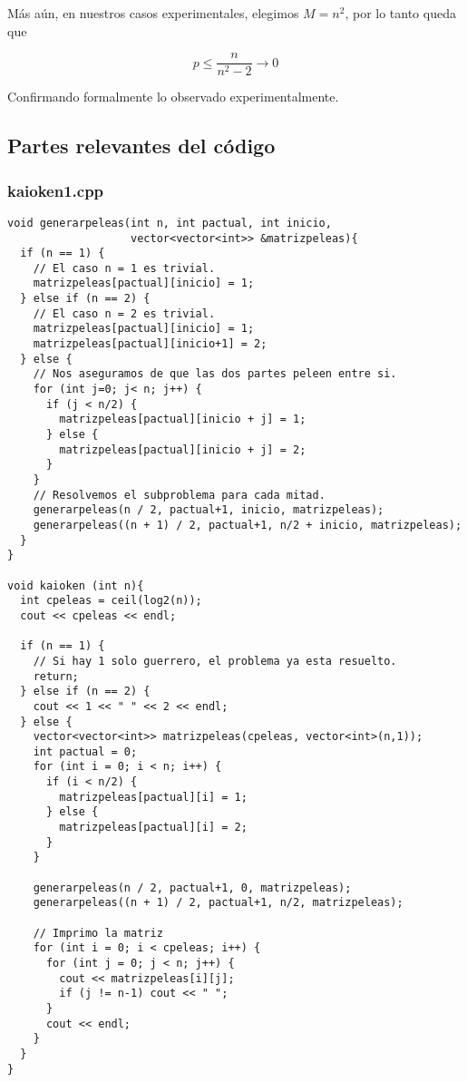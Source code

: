 Más aún, en nuestros casos experimentales, elegimos $M = n^2$, por lo tanto queda que

\[p \leq \frac{n} {n^2 - 2} \to 0\]

Confirmando formalmente lo observado experimentalmente.

\newpage
\subsection{Partes relevantes del código}
\lstset{language=C++, breaklines=true, basicstyle=\footnotesize}
\lstset{numbers=left, numberstyle=\tiny, stepnumber=1, numbersep=5pt, tabsize=2}

\subsubsection{kaioken1.cpp}
\begin{lstlisting}[frame=single]
void generarpeleas(int n, int pactual, int inicio,
                   vector<vector<int>> &matrizpeleas){
  if (n == 1) {
    // El caso n = 1 es trivial.
    matrizpeleas[pactual][inicio] = 1;
  } else if (n == 2) {
    // El caso n = 2 es trivial.
    matrizpeleas[pactual][inicio] = 1;
    matrizpeleas[pactual][inicio+1] = 2;
  } else {
    // Nos aseguramos de que las dos partes peleen entre si.
    for (int j=0; j< n; j++) {
      if (j < n/2) {
        matrizpeleas[pactual][inicio + j] = 1;
      } else {
        matrizpeleas[pactual][inicio + j] = 2;
      }
    }
    // Resolvemos el subproblema para cada mitad.
    generarpeleas(n / 2, pactual+1, inicio, matrizpeleas);
    generarpeleas((n + 1) / 2, pactual+1, n/2 + inicio, matrizpeleas);
  }
}

void kaioken (int n){
  int cpeleas = ceil(log2(n));
  cout << cpeleas << endl;

  if (n == 1) {
    // Si hay 1 solo guerrero, el problema ya esta resuelto.
    return;
  } else if (n == 2) {
    cout << 1 << " " << 2 << endl;
  } else {
    vector<vector<int>> matrizpeleas(cpeleas, vector<int>(n,1));
    int pactual = 0;
    for (int i = 0; i < n; i++) {
      if (i < n/2) {
        matrizpeleas[pactual][i] = 1;
      } else {
        matrizpeleas[pactual][i] = 2;
      }
    }

    generarpeleas(n / 2, pactual+1, 0, matrizpeleas);
    generarpeleas((n + 1) / 2, pactual+1, n/2, matrizpeleas);

    // Imprimo la matriz
    for (int i = 0; i < cpeleas; i++) {
      for (int j = 0; j < n; j++) {
        cout << matrizpeleas[i][j];
        if (j != n-1) cout << " ";
      }
      cout << endl;
    }
  }
} 
\end{lstlisting}

